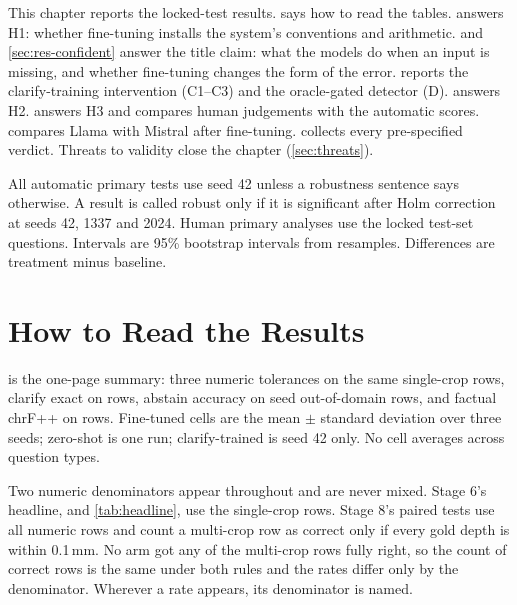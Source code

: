 This chapter reports the locked-test results.  says how to read the tables.  answers H1: whether fine-tuning installs the system's conventions and arithmetic.  and \cref{sec:res-confident} answer the title claim: what the models do when an input is missing, and whether fine-tuning changes the form of the error.  reports the clarify-training intervention (C1--C3) and the oracle-gated detector (D).  answers H2.  answers H3 and compares human judgements with the automatic scores.  compares Llama with Mistral after fine-tuning.  collects every pre-specified verdict. Threats to validity close the chapter (\cref{sec:threats}).

All automatic primary tests use seed 42 unless a robustness sentence says otherwise. A result is called robust only if it is significant after Holm correction at seeds 42, 1337 and 2024. Human primary analyses use the \HumInTest locked test-set questions. Intervals are 95\% bootstrap intervals from \PlanBootstrap resamples. Differences are treatment minus baseline.

\section{How to Read the Results}
\label{sec:res-read}

 is the one-page summary: three numeric tolerances on the same \NumericSingle single-crop rows, clarify exact on \TestClarify rows, abstain accuracy on \TestAbstain seed out-of-domain rows, and factual chrF++ on \TestFactual rows. Fine-tuned cells are the mean $\pm$ standard deviation over three seeds; zero-shot is one run; clarify-trained is seed 42 only. No cell averages across question types.

Two numeric denominators appear throughout and are never mixed. Stage 6's headline, and \cref{tab:headline}, use the \NumericSingle single-crop rows. Stage 8's paired tests use all \NumericAll numeric rows and count a multi-crop row as correct only if every gold depth is within 0.1\,mm. No arm got any of the \NumericMulti multi-crop rows fully right, so the count of correct rows is the same under both rules and the rates differ only by the denominator. Wherever a rate appears, its denominator is named.



